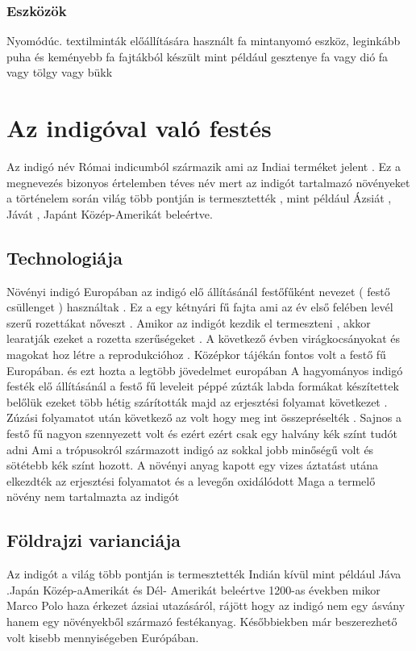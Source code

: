 \documentclass[fontsize=12pt, appendixprefix=true]{scrreprt}
\begin{document}
\subsection{Eszközök}
Nyomódúc. textilminták előállítására használt fa mintanyomó eszköz, leginkább puha és keményebb fa fajtákból készült mint például gesztenye fa vagy dió fa vagy tölgy vagy bükk
\chapter{Az indigóval való festés}
Az indigó név Római indicumból származik ami az Indiai terméket jelent .
Ez a megnevezés bizonyos értelemben téves név mert az indigót tartalmazó növényeket a történelem során világ több pontján is termesztették , mint például Ázsiát , Jávát , Japánt Közép-Amerikát beleértve.
 
\section{Technologiája}
 Növényi indigó 
 Europában az indigó elő állításánál festőfűként nevezet ( festő csüllenget ) használtak .
 Ez a egy kétnyári fű fajta ami az év első felében levél szerű rozettákat nőveszt .
 Amikor az indigót kezdik el termeszteni , akkor learatják ezeket a rozetta szerűségeket .
 A következő évben  virágkocsányokat és magokat hoz létre a reprodukcióhoz .
 Középkor tájékán fontos volt a festő fű Europában.
 és ezt hozta a legtöbb jövedelmet europában  
 A hagyományos indigó festék elő állításánál a festő fű leveleit péppé zúzták labda formákat készítettek belőlük ezeket több hétig szárították 
 majd az erjesztési folyamat  következet .
 Zúzási folyamatot után következő az volt hogy meg int összepréselték .
 Sajnos a festő  fű nagyon szennyezett volt és ezért ezért csak egy halvány kék színt tudót  adni 
 Ami a trópusokról származott indigó az sokkal jobb minőségű volt és sötétebb kék színt hozott.
 A növényi anyag kapott egy vizes áztatást utána elkezdték az erjesztési folyamatot és a levegőn oxidálódott  
 Maga a termelő növény nem tartalmazta az indigót 



\section{Földrajzi varianciája}
Az indigót a világ több pontján is termesztették  Indián kívül mint például Jáva .Japán Közép-aAmerikát és Dél- Amerikát beleértve 
1200-as években mikor Marco Polo haza érkezet ázsiai utazásáról, rájött hogy az indigó nem egy ásvány hanem egy növényekből származó festékanyag.
Későbbiekben már beszerezhető volt kisebb mennyiségeben Európában.
\end{document}
